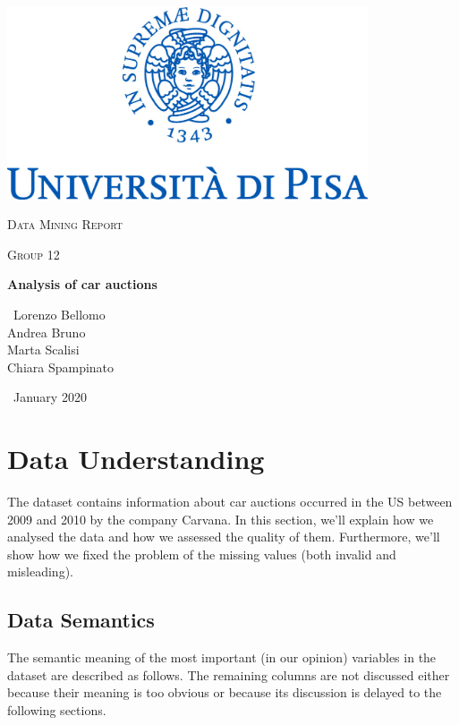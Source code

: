 \documentclass{article}
\begin{document}
	
	\begin{titlepage}
		\centering
		\includegraphics[width=0.80\textwidth]{marchio.jpg}\par\vspace{2cm}
		{\scshape\LARGE Data Mining Report \par}
		\vspace{1cm}
		{\scshape\Large Group 12 \\ \par}
		\vspace{1cm}
		{\huge\bfseries Analysis of car auctions\par}
		\vspace{2cm}
		{\Large\ Lorenzo Bellomo \\ Andrea Bruno \\ Marta Scalisi \\ Chiara Spampinato\par}
		\vspace{4cm}
		{\Large\ January 2020\par}
	\end{titlepage}
	
	
	
	
	\section{Data Understanding}
	The dataset contains information about car auctions occurred in the US between 2009 and 2010 by the company Carvana. In this section, we'll explain how we analysed the data and how we assessed the quality of them. Furthermore, we'll show how we fixed the problem of the missing values (both invalid and misleading).
	
	\subsection{Data Semantics}
	\label{sec:dataSemantics}
	The semantic meaning of the most important (in our opinion) variables in the dataset are described as follows. The remaining columns are not discussed either because their meaning is too obvious or because its discussion is delayed to the following sections.
	
\end{document}
